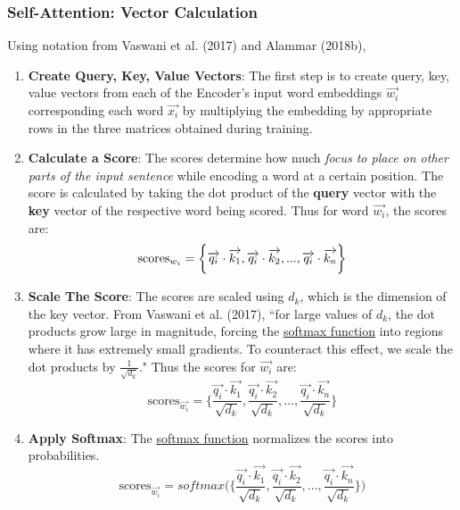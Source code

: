 \subsubsection{Self-Attention: Vector Calculation}

Using notation from Vaswani et al. (2017) and Alammar (2018b), 

\begin{enumerate}
    \item \textbf{Create Query, Key, Value Vectors}: The first step is to create query, key, value vectors from each of the Encoder's input word embeddings $\overrightarrow{w_i}$ corresponding each word $\overrightarrow{x_i}$ by multiplying the embedding by appropriate rows in the three matrices obtained during training. \newline

    \item \textbf{Calculate a Score}: The scores determine how much \emph{focus to place on other parts of the input sentence} while encoding a word at a certain position.  The score is calculated by taking the dot product of the \textbf{query} vector with the \textbf{key} vector of the respective word being scored. Thus for word $\overrightarrow{w_i}$, the scores are: 
    $$
    \text{scores}_{\Large w_i} = \bigg\{
    \overrightarrow{q_i} \cdot \overrightarrow{k_1},
    \overrightarrow{q_i} \cdot \overrightarrow{k_2},
    ...,
    \overrightarrow{q_i} \cdot \overrightarrow{k_n} \bigg\}
    $$

    \item \textbf{Scale The Score}: The scores are scaled using $d_k$, which is the dimension of the key vector. From Vaswani et al. (2017), ``for large values of $d_k$, the dot products grow large in  magnitude, forcing the \hyperref[cnc:softmaxLayer]{softmax function} into regions where it has extremely small gradients. To counteract this effect, we scale the dot products by $\frac {1} {\sqrt{d_k}}$." Thus the scores for $\overrightarrow{w_i}$ are:
    $$
    \text{scores}_{\overrightarrow{w_i}} = \Bigg\{
    \frac {\overrightarrow{q_i} \cdot \overrightarrow{k_1}} {\sqrt{d_k}},
    \frac {\overrightarrow{q_i} \cdot \overrightarrow{k_2}} {\sqrt{d_k}},
    ...,
    \frac{\overrightarrow{q_i} \cdot \overrightarrow{k_n}} {\sqrt{d_k}} \Bigg\}
    $$
    
    \item \textbf{Apply Softmax}: The \hyperref[cnc:softmaxLayer]{softmax function} normalizes the scores into probabilities. 
    $$
    \text{scores}_{\overrightarrow{w_i}} = softmax \Bigg( \Bigg\{
    \frac {\overrightarrow{q_i} \cdot \overrightarrow{k_1}} {\sqrt{d_k}},
    \frac {\overrightarrow{q_i} \cdot \overrightarrow{k_2}} {\sqrt{d_k}},
    ...,
    \frac{\overrightarrow{q_i} \cdot \overrightarrow{k_n}} {\sqrt{d_k}} \Bigg\} \Bigg)
    $$


\end{enumerate}

